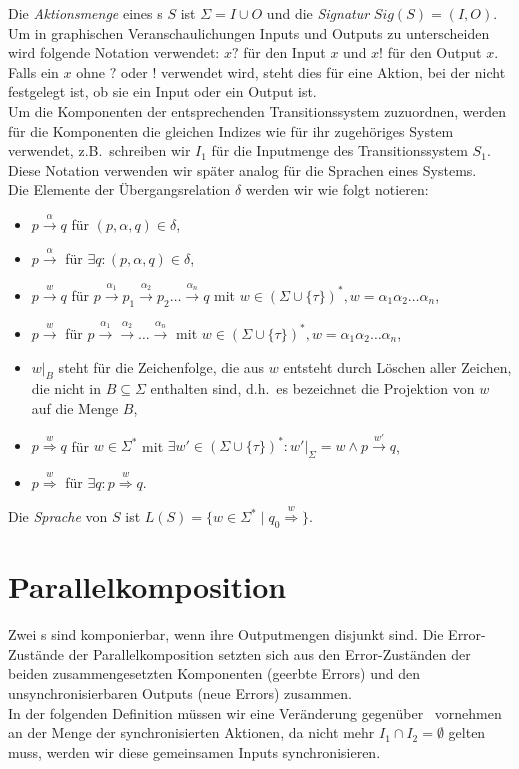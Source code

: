 Die \emph{Aktionsmenge} eines \EIO{}s $S$ ist $\Sigma = I\cup O$ und die
\emph{Signatur} $Sig(S)=(I,O)$.\\
Um in graphischen Veranschaulichungen Inputs und Outputs zu unterscheiden wird
folgende Notation verwendet: $x?$ für den Input $x$ und $x!$ für den Output
$x$. Falls ein $x$ ohne $?$ oder $!$ verwendet wird, steht dies für eine
Aktion, bei der nicht festgelegt ist, ob sie ein Input oder ein Output ist.\\
Um die Komponenten der entsprechenden Transitionssystem zuzuordnen, werden für
die Komponenten die gleichen Indizes wie für ihr zugehöriges System verwendet,
z.B.\ schreiben wir $I_1$ für die Inputmenge des Transitionssystem $S_1$. Diese
Notation verwenden wir später analog für die Sprachen eines Systems.\\
Die Elemente der Übergangsrelation $\delta$ werden wir wie folgt notieren:
\begin{itemize}
  \item $p\overset{\alpha}{\rightarrow} q$ für $(p,\alpha ,q)\in\delta$,
  \item $p\overset{\alpha}{\rightarrow}$ für $\exists q: (p,\alpha ,q)\in\delta$,
  \item $p\overset{w}{\rightarrow} q$ für $p \overset{\alpha _1}{\rightarrow}
    p_1 \overset{\alpha _2}{\rightarrow} p_2\dots \overset{\alpha
    _n}{\rightarrow} q$ mit $w\in (\Sigma\cup\{\tau\})^*, w=\alpha _1\alpha
    _2\dots \alpha _n$,
  \item $p\overset{w}{\rightarrow}$ für $p \overset{\alpha _1}{\rightarrow}
    \overset{\alpha _2}{\rightarrow} \dots \overset{\alpha _n}{\rightarrow}$
    mit $w\in (\Sigma\cup\{\tau\})^*, w=\alpha _1\alpha _2\dots \alpha _n$,
  \item $w|_B$ steht für die Zeichenfolge, die aus $w$ entsteht durch Löschen
    aller Zeichen, die nicht in $B\subseteq\Sigma$ enthalten sind, d.h.\ es
    bezeichnet die Projektion von $w$ auf die Menge $B$,
  \item $p\overset{w}{\Rightarrow} q$ für $w\in\Sigma^*$ mit $\exists
    w'\in(\Sigma\cup\{\tau\})^*:w'|_{\Sigma}=w\wedge p\overset{w'}{\rightarrow}
    q$,
  \item $p\overset{w}{\Rightarrow}$ für $\exists q:p\overset{w}{\Rightarrow}
    q$.
\end{itemize}
Die \emph{Sprache} von $S$ ist
$L(S)=\{w\in\Sigma^*\mid q_0\overset{w}{\Rightarrow}\}$.

\section{Parallelkomposition}
Zwei \EIO{}s sind komponierbar, wenn ihre Outputmengen disjunkt sind. Die
Error-Zustän\-de der Parallelkomposition setzten sich aus den Error-Zuständen der
beiden zusammengesetzten Komponenten (geerbte Errors) und den
unsynchronisierbaren Outputs (neue Errors) zusammen.\\
In der folgenden Definition müssen wir eine Veränderung
gegenüber~\cite{Vogler2014EIO} vornehmen an der Menge der synchronisierten
Aktionen, da nicht mehr $I_1\cap I_2 =\emptyset$ gelten muss, werden wir
diese gemeinsamen Inputs synchronisieren.

